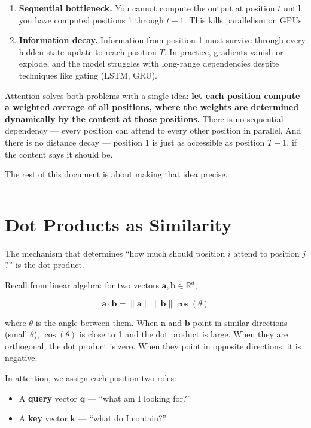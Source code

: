 \begin{enumerate}
  \item \textbf{Sequential bottleneck.} You cannot compute the output at position $t$ until you have computed positions 1 through $t-1$. This kills parallelism on GPUs.
  \item \textbf{Information decay.} Information from position 1 must survive through every hidden-state update to reach position $T$. In practice, gradients vanish or explode, and the model struggles with long-range dependencies despite techniques like gating (LSTM, GRU).
\end{enumerate}

Attention solves both problems with a single idea: \textbf{let each position compute a weighted average of all positions, where the weights are determined dynamically by the content at those positions.} There is no sequential dependency --- every position can attend to every other position in parallel. And there is no distance decay --- position 1 is just as accessible as position $T-1$, if the content says it should be.

The rest of this document is about making that idea precise.

\bigskip\hrule\bigskip

\section{Dot Products as Similarity}

The mechanism that determines ``how much should position $i$ attend to position $j$?'' is the dot product.

Recall from linear algebra: for two vectors $\mathbf{a}, \mathbf{b} \in \mathbb{R}^d$,

\[
\mathbf{a} \cdot \mathbf{b} = \|\mathbf{a}\| \, \|\mathbf{b}\| \cos(\theta)
\]

where $\theta$ is the angle between them. When $\mathbf{a}$ and $\mathbf{b}$ point in similar directions (small $\theta$), $\cos(\theta)$ is close to 1 and the dot product is large. When they are orthogonal, the dot product is zero. When they point in opposite directions, it is negative.

In attention, we assign each position two roles:

\begin{itemize}
  \item A \textbf{query} vector $\mathbf{q}$ --- ``what am I looking for?''
  \item A \textbf{key} vector $\mathbf{k}$ --- ``what do I contain?''
\end{itemize}

